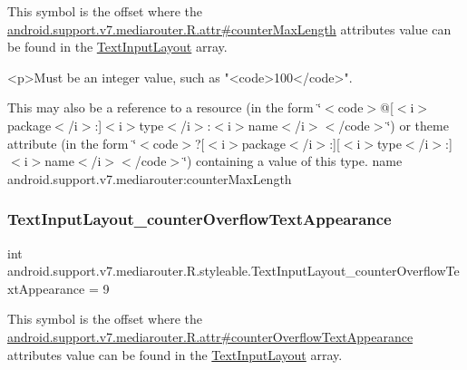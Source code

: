 This symbol is the offset where the \hyperlink{classandroid_1_1support_1_1v7_1_1mediarouter_1_1R_1_1attr_aef123b7d5dda75ae66b80093cc4058b8}{android.\+support.\+v7.\+mediarouter.\+R.\+attr\#counter\+Max\+Length} attribute\textquotesingle{}s value can be found in the \hyperlink{classandroid_1_1support_1_1v7_1_1mediarouter_1_1R_1_1styleable_a935a5feb3f0394eb1c07f26b207dfb2d}{Text\+Input\+Layout} array.

\begin{DoxyVerb}      <p>Must be an integer value, such as "<code>100</code>".
\end{DoxyVerb}
 

This may also be a reference to a resource (in the form \char`\"{}$<$code$>$@\mbox{[}$<$i$>$package$<$/i$>$\+:\mbox{]}$<$i$>$type$<$/i$>$\+:$<$i$>$name$<$/i$>$$<$/code$>$\char`\"{}) or theme attribute (in the form \char`\"{}$<$code$>$?\mbox{[}$<$i$>$package$<$/i$>$\+:\mbox{]}\mbox{[}$<$i$>$type$<$/i$>$\+:\mbox{]}$<$i$>$name$<$/i$>$$<$/code$>$\char`\"{}) containing a value of this type.  name android.\+support.\+v7.\+mediarouter\+:counter\+Max\+Length \mbox{\label{classandroid_1_1support_1_1v7_1_1mediarouter_1_1R_1_1styleable_a6b4f04d61761f9eee7e2fd1a97c8503f}} 
\subsubsection{\texorpdfstring{Text\+Input\+Layout\+\_\+counter\+Overflow\+Text\+Appearance}{TextInputLayout\_counterOverflowTextAppearance}}
{\footnotesize\ttfamily int android.\+support.\+v7.\+mediarouter.\+R.\+styleable.\+Text\+Input\+Layout\+\_\+counter\+Overflow\+Text\+Appearance = 9\hspace{0.3cm}{\ttfamily [static]}}

This symbol is the offset where the \hyperlink{classandroid_1_1support_1_1v7_1_1mediarouter_1_1R_1_1attr_aa04cf2f0df85f42d9d16c4f0c35e3f3d}{android.\+support.\+v7.\+mediarouter.\+R.\+attr\#counter\+Overflow\+Text\+Appearance} attribute\textquotesingle{}s value can be found in the \hyperlink{classandroid_1_1support_1_1v7_1_1mediarouter_1_1R_1_1styleable_a935a5feb3f0394eb1c07f26b207dfb2d}{Text\+Input\+Layout} array.

